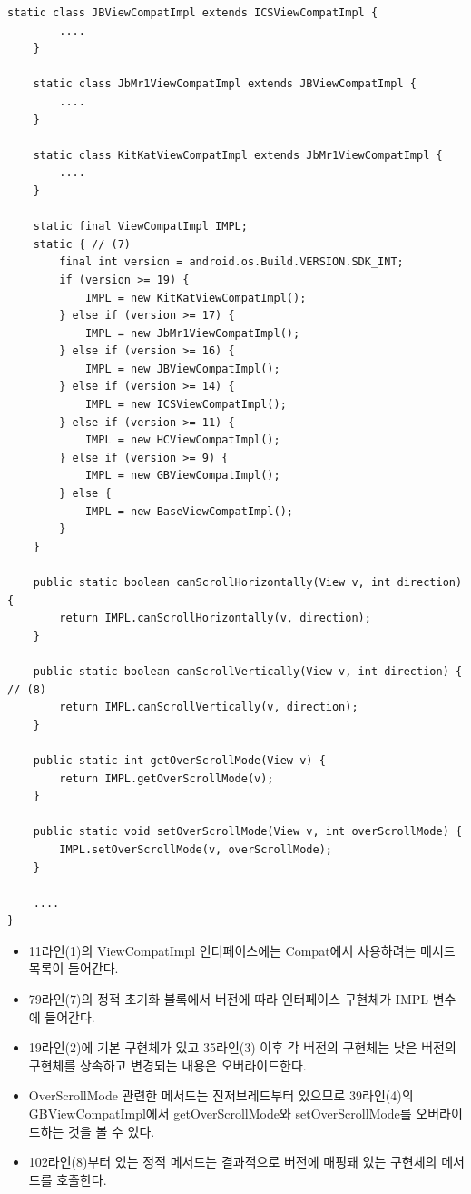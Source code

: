 \begin{lstlisting}[frame=single]
    static class JBViewCompatImpl extends ICSViewCompatImpl {
        ....
    }

    static class JbMr1ViewCompatImpl extends JBViewCompatImpl {
    	....
    }

    static class KitKatViewCompatImpl extends JbMr1ViewCompatImpl {
        ....
    }

    static final ViewCompatImpl IMPL;
    static { // (7)
        final int version = android.os.Build.VERSION.SDK_INT;
        if (version >= 19) {
            IMPL = new KitKatViewCompatImpl();
        } else if (version >= 17) {
            IMPL = new JbMr1ViewCompatImpl();
        } else if (version >= 16) {
            IMPL = new JBViewCompatImpl();
        } else if (version >= 14) {
            IMPL = new ICSViewCompatImpl();
        } else if (version >= 11) {
            IMPL = new HCViewCompatImpl();
        } else if (version >= 9) {
            IMPL = new GBViewCompatImpl();
        } else {
            IMPL = new BaseViewCompatImpl();
        }
    }

    public static boolean canScrollHorizontally(View v, int direction) {
        return IMPL.canScrollHorizontally(v, direction);
    }

    public static boolean canScrollVertically(View v, int direction) { // (8)
        return IMPL.canScrollVertically(v, direction);
    }

    public static int getOverScrollMode(View v) {
        return IMPL.getOverScrollMode(v);
    }

    public static void setOverScrollMode(View v, int overScrollMode) {
        IMPL.setOverScrollMode(v, overScrollMode);
    }

 	....
}

\end{lstlisting}
\begin{itemize}
\item 11라인(1)의 ViewCompatImpl 인터페이스에는 Compat에서 사용하려는 메서드 목록이 들어간다. 
\item 79라인(7)의 정적 초기화 블록에서 버전에 따라 인터페이스 구현체가 IMPL 변수에 들어간다.
\item 19라인(2)에 기본 구현체가 있고 35라인(3) 이후 각 버전의 구현체는 낮은 버전의 구현체를 상속하고 변경되는 내용은 오버라이드한다.
\item OverScrollMode 관련한 메서드는 진저브레드부터 있으므로 39라인(4)의 GBViewCompatImpl에서 getOverScrollMode와 setOverScrollMode를 오버라이드하는 것을 볼 수 있다.
\item 102라인(8)부터 있는 정적 메서드는 결과적으로 버전에 매핑돼 있는 구현체의 메서드를 호출한다.
\end{itemize}

